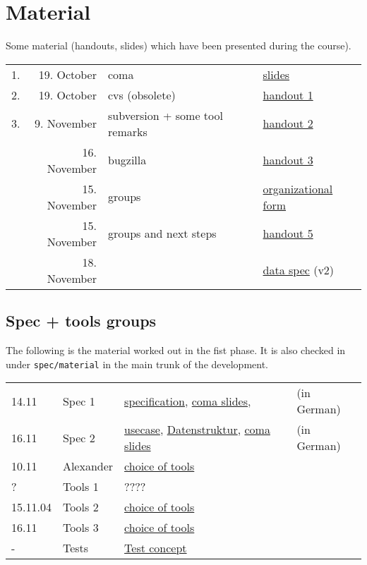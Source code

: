 
\section*{Material}

Some material (handouts, slides) which have been presented during the
course).

\begin{tabular}{r@{\quad\quad}rll}
  \hline
  1. & 19. October & coma  & 
  \href{slides/main-coma.pdf}{slides}
  \\
  2. & 19. October & cvs (obsolete) & \href{handouts/handout1.pdf}{handout 1}
  \\
  3. & 9. November & subversion + some tool remarks &
  \href{handouts/handout2.pdf}{handout 2}
  \\
   & 16. November & bugzilla &
  \href{handouts/handout3.pdf}{handout 3}
  \\
   & 15. November & groups &
  \href{handouts/handout4.pdf}{organizational form}
  \\
   & 15. November & groups and next steps &
  \href{handouts/handout5.pdf}{handout 5}
  \\\hline 
   & 18. November &  &
  \href{spec/v2/main.pdf}{data spec} (v2)
  \\\hline
\end{tabular}




\subsection*{Spec + tools groups}
\label{sec:material.spec-tools}%

The following is the material worked out in the fist phase. It is also
checked in under \texttt{spec/material} in the main trunk of the
development.


\begin{tabular}{llll}
  14.11 & Spec 1 & 
  \href{spec/material/spec1/spezifikation.pdf}{specification}, 
  \href{spec/material/spec1/slides.pdf}{coma slides}, 
  & (in German)
  \\
  16.11 & Spec 2 & 
  \href{spec/material/spec2/usecase.pdf}{usecase}, 
  \href{spec/material/spec2/datenstruktur.ps}{Datenstruktur}, 
  \href{spec/material/spec2/slides.pdf}{coma slides}
  & (in German)
  \\
  10.11 & Alexander & \href{spec/material/derenbach/tools.pdf}{choice of tools}
  \\
  ?  & Tools 1 & ????
  \\
  15.11.04 & Tools 2 &
  \href{spec/material/tools2/tools.pdf}{choice of tools}
  \\
  16.11 & Tools 3 & \href{spec/material/tools3/tools.pdf}{choice of tools}
  \\
  - & Tests & \href{spec/material/tests/tests.txt}{Test concept}
\end{tabular}




